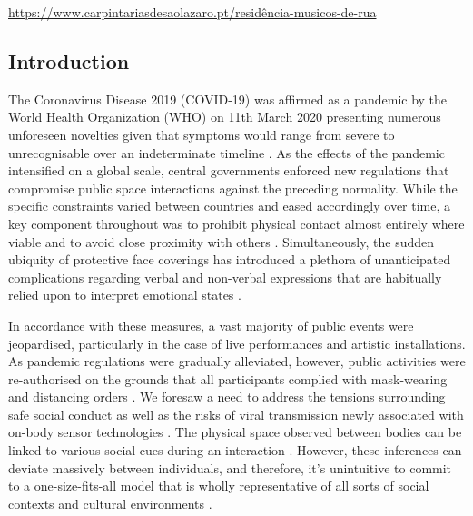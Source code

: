 \url{https://www.carpintariasdesaolazaro.pt/residência-musicos-de-rua}

\subsection{Introduction}

The Coronavirus Disease 2019 (COVID-19) was affirmed as a pandemic by the World Health Organization (WHO) on 11th March 2020 \citep{cucinotta_who_2020} presenting numerous unforeseen novelties given that symptoms would range from severe to unrecognisable over an indeterminate timeline \citep{woelfel_clinical_2020}. As the effects of the pandemic intensified on a global scale, central governments enforced new regulations that compromise public space interactions against the preceding normality. While the specific constraints varied between countries and eased accordingly over time, a key component throughout was to prohibit physical contact almost entirely where viable and to avoid close proximity with others \citep{toquero_challenges_2020, uk_department_of_health_and_social_care_coronavirus_2020}. Simultaneously, the sudden ubiquity of protective face coverings has introduced a plethora of unanticipated complications regarding verbal and non-verbal expressions that are habitually relied upon to interpret emotional states \citep{marta_i_2020,carbon_wearing_2020,grundmann_face_2020}.

In accordance with these measures, a vast majority of public events were jeopardised, particularly in the case of live performances and artistic installations. As pandemic regulations were gradually alleviated, however, public activities were re-authorised on the grounds that all participants complied with mask-wearing and distancing orders \citep{direcao-geral_da_saude_dgs_covid-19_2020}. We foresaw a need to address the tensions surrounding safe social conduct as well as the risks of viral transmission newly associated with on-body sensor technologies \citep{seshadri_wearable_2020,jeong_continuous_2020}. The physical space observed between bodies can be linked to various social cues during an interaction \citep{kroczek_interpersonal_2020,vinciarelli_towards_2011,sundstrom_interpersonal_1976}. However, these inferences can deviate massively between individuals, and therefore, it’s unintuitive to commit to a one-size-fits-all model that is wholly representative of all sorts of social contexts and cultural environments \citep{yu_investigation_2020,sorokowska_preferred_2017}.

